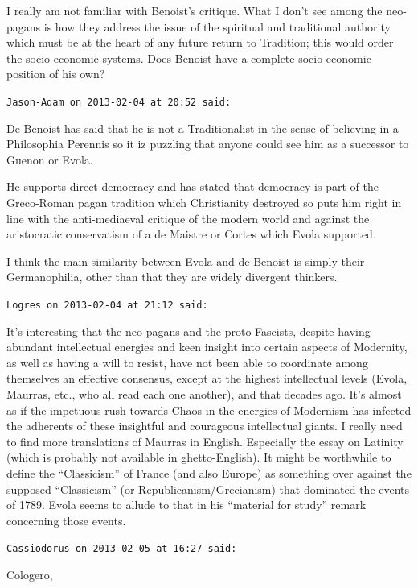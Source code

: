 \begin{footnotesize}
\begin{sffamily}
I really am not familiar with Benoist's critique. What I don't see among the neo-pagans is how they address the issue of the spiritual and traditional authority which must be at the heart of any future return to Tradition; this would order the socio-economic systems. Does Benoist have a complete socio-economic position of his own?

\hfill

\texttt{Jason-Adam on 2013-02-04 at 20:52 said:}

De Benoist has said that he is not a Traditionalist in the sense of believing in a Philosophia Perennis so it iz puzzling that anyone could see him as a successor to Guenon or Evola.

He supports direct democracy and has stated that democracy is part of the Greco-Roman pagan tradition which Christianity destroyed so puts him right in line with the anti-mediaeval critique of the modern world and against the aristocratic conservatism of a de Maistre or Cortes which Evola supported.

I think the main similarity between Evola and de Benoist is simply their Germanophilia, other than that they are widely divergent thinkers.

\hfill

\texttt{Logres on 2013-02-04 at 21:12 said:}

It's interesting that the neo-pagans and the proto-Fascists, despite having abundant intellectual energies and keen insight into certain aspects of Modernity, as well as having a will to resist, have not been able to coordinate among themselves an effective consensus, except at the highest intellectual levels (Evola, Maurras, etc., who all read each one another), and that decades ago. It's almost as if the impetuous rush towards Chaos in the energies of Modernism has infected the adherents of these insightful and courageous intellectual giants. I really need to find more translations of Maurras in English. Especially the essay on Latinity (which is probably not available in ghetto-English). It might be worthwhile to define the ``Classicism'' of France (and also Europe) as something over against the supposed ``Classicism'' (or Republicanism/Grecianism) that dominated the events of 1789. Evola seems to allude to that in his ``material for study'' remark concerning those events.

\hfill

\texttt{Cassiodorus on 2013-02-05 at 16:27 said:}

Cologero,


\end{sffamily}
\end{footnotesize}
